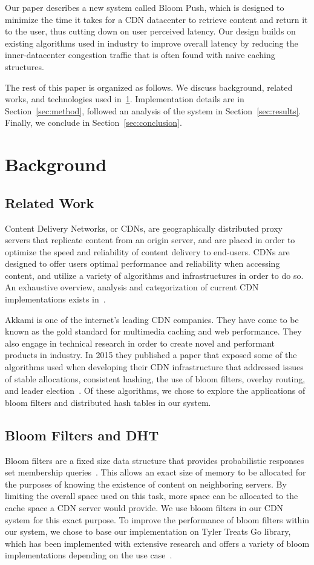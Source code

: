 \documentclass[conference]{IEEEtran}
\begin{document}
Our paper describes a new system called Bloom Push, which is designed to minimize the time it takes for a CDN datacenter to retrieve content and return it to the user, thus cutting down on user perceived latency.  Our design builds on existing algorithms used in industry to improve overall latency by reducing the inner-datacenter congestion traffic that is often found with naive caching structures.

The rest of this paper is organized as follows.  We discuss background, related works, and technologies used in~\ref{sec:back}.  Implementation details are in Section~\ref{sec:method}, followed an analysis of the system in Section~\ref{sec:results}.  Finally, we conclude in Section~\ref{sec:conclusion}. 

\section{Background}\label{sec:back}
\subsection*{Related Work}
Content Delivery Networks, or CDNs, are geographically distributed proxy servers that replicate content from an origin server, and are placed in order to optimize the speed and reliability of content delivery to end-users. CDNs are designed to offer users optimal performance and reliability when accessing content, and utilize a variety of algorithms and infrastructures in order to do so. An exhaustive overview, analysis and categorization of current CDN implementations exists in~\cite{PathanTaxonomy}. 

Akkami is one of the internet's leading CDN companies.  They have come to be known as the gold standard for multimedia caching and web performance. They also engage in technical research in order to create novel and performant products in industry. In 2015 they published a paper that exposed some of the algorithms used when developing their CDN infrastructure that addressed issues of stable allocations, consistent hashing, the use of bloom filters, overlay routing, and leader election~\cite{MaggsNuggets}.  Of these algorithms, we chose to explore the applications of bloom filters and distributed hash tables in our system.

\subsection*{Bloom Filters and DHT}
Bloom filters are a fixed size data structure that provides probabilistic responses set membership queries~\cite{BroderBloom}.  This allows an exact size of memory to be allocated for the purposes of knowing the existence of content on neighboring servers.  By limiting the overall space used on this task, more space can be allocated to the cache space a CDN server would provide.  We use bloom filters in our CDN system for this exact purpose.  To improve the performance of bloom filters within our system, we chose to base our implementation on Tyler Treats Go library, which has been implemented with extensive research and offers a variety of bloom implementations depending on the use case~\cite{TreatBloom}.
\end{document}
